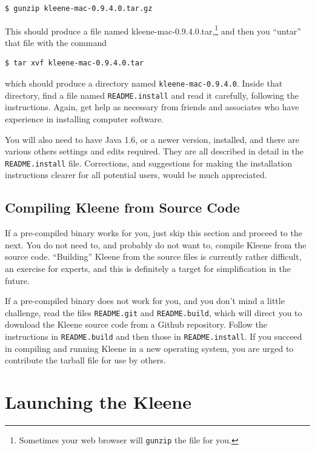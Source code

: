 \begin{Verbatim}
$ gunzip kleene-mac-0.9.4.0.tar.gz
\end{Verbatim}

\noindent
This should produce a file named kleene-mac-0.9.4.0.tar,\footnote{Sometimes 
your web browser will \texttt{gunzip} the file for you.} and then you
``untar'' that file with the command

\begin{Verbatim}
$ tar xvf kleene-mac-0.9.4.0.tar
\end{Verbatim}

\noindent
which should produce a directory named \texttt{kleene-mac-0.9.4.0}.  Inside that directory, 
find a file named \texttt{README.install} and read it carefully, following the 
instructions.  Again, get help as necessary from friends and associates who have 
experience in installing computer
software.

You will also need to have Java 1.6, or a newer version, installed, and
there are various others settings and edits required.  They are all
described in detail in the \texttt{README.install} file.
Corrections, and suggestions for making the installation instructions clearer for all
potential users, would be much appreciated.

\subsection{Compiling Kleene from Source Code}

If a pre-compiled binary works for you, just skip this section and proceed to the next.
You do not need to, and probably do not want to, compile Kleene from the
source code.  ``Building'' Kleene from the source files is currently
rather difficult, an exercise for experts, and this is definitely a target
for simplification in the future.

If a pre-compiled binary does not work for you, and you don't mind a little
challenge, read the files \texttt{README.git} and \texttt{README.build},
which will direct you to download the Kleene source code from a Github
repository.  Follow the instructions in \texttt{README.build} and then
those in \texttt{README.install}.  If you succeed in compiling and running
Kleene in a new operating system, you are urged to contribute the
tarball file for use by others.

\section{Launching the Kleene }

